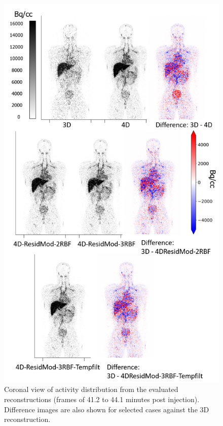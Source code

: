 \begin{figure} [h!]
\centering
\includegraphics[scale=1.1, angle=0]{3_Results/3_3_DWB_Reconstruction/MIC2020/Frame14DifferencesV2.png}

\caption{Coronal view of activity distribution from the evaluated reconstructions (frames of 41.2 to 44.1 minutes post injection). Difference images are also shown for selected cases against the 3D reconstruction.}
\label{fig:Frame14Differences}
\end{figure}

